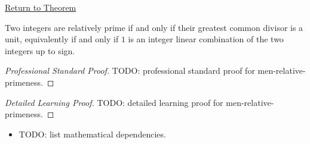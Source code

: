\newpage
{}
\label{prf:men-relative-primeness}

\begin{remark*}[Return]
\hyperref[thm:men-relative-primeness]{Return to Theorem}
\end{remark*}

\begin{theorem*}
Two integers are relatively prime if and only if their greatest common divisor
is a unit, equivalently if and only if \(1\) is an integer linear combination
of the two integers up to sign.
\end{theorem*}

\begin{proof}[Professional Standard Proof]
\LRAProofBodyStart
TODO: professional standard proof for men-relative-primeness.
\end{proof}

\begin{proof}[Detailed Learning Proof]
\LRAProofBodyStart
TODO: detailed learning proof for men-relative-primeness.
\end{proof}

\begin{remark*}
\end{remark*}

\begin{dependencies}
\begin{itemize}
  \item TODO: list mathematical dependencies.
\end{itemize}
\end{dependencies}

\clearpage
